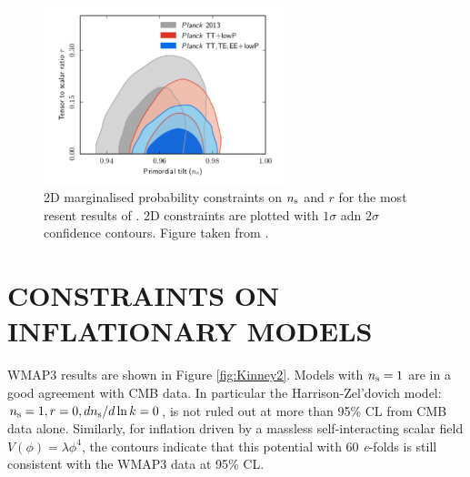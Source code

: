 \documentclass{rmaa}
\begin{document}
\begin{figure}[h!]
 \begin{center}
 \includegraphics[width=7cm]{planckres}
\caption{2D marginalised probability constraints on $n_{\rm s}$ and $r$ for
the most resent results of \citep{PlanckC}. 2D constraints are plotted with $1\sigma$ adn $2\sigma$
confidence contours. Figure taken from \citep{PlanckC}.
}\label{fig:infla_2}
\end{center}
\end{figure}	




\section{CONSTRAINTS ON INFLATIONARY MODELS}

WMAP3 results are shown in Figure \ref{fig:Kinney2}. Models with $n_{\rm s}=1$ are in a 
good agreement with CMB data. In particular the Harrison-Zel'dovich model: $n_{\rm s}=1, 
r=0, dn_{\rm s}/d \ln k=0$, is not ruled out at more than 95\% CL from CMB data alone.
Similarly, for inflation driven by a massless self-interacting scalar field
$V(\phi) = \lambda\phi^4$,  the contours indicate that this potential
with 60 \textit{e}-folds is still consistent with the WMAP3 data at 95\% CL. 
\\
\end{document}
